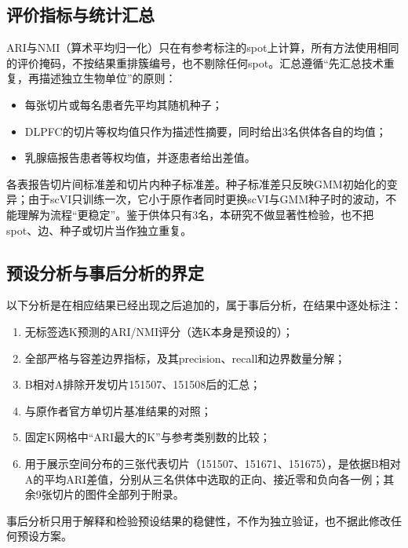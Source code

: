 \subsection{评价指标与统计汇总}
\label{subsec:cc-metrics-p1}
ARI与NMI（算术平均归一化）只在有参考标注的spot上计算，所有方法使用相同的评价掩码，不按结果重排簇编号，也不剔除任何spot。汇总遵循“先汇总技术重复，再描述独立生物单位”的原则：
\begin{itemize}
  \item 每张切片或每名患者先平均其随机种子；
  \item DLPFC的切片等权均值只作为描述性摘要，同时给出3名供体各自的均值；
  \item 乳腺癌报告患者等权均值，并逐患者给出差值。
\end{itemize}
各表报告切片间标准差和切片内种子标准差。种子标准差只反映GMM初始化的变异；由于scVI只训练一次，它小于原作者同时更换scVI与GMM种子时的波动，不能理解为流程“更稳定”。鉴于供体只有3名，本研究不做显著性检验，也不把spot、边、种子或切片当作独立重复。

\subsection{预设分析与事后分析的界定}
\label{subsec:cc-posthoc-p1}
以下分析是在相应结果已经出现之后追加的，属于事后分析，在结果中逐处标注：
\begin{enumerate}
  \item 无标签选K预测的ARI/NMI评分（选K本身是预设的）；
  \item 全部严格与容差边界指标，及其precision、recall和边界数量分解；
  \item B相对A排除开发切片151507、151508后的汇总；
  \item 与原作者官方单切片基准结果的对照；
  \item 固定K网格中“ARI最大的K”与参考类别数的比较；
  \item 用于展示空间分布的三张代表切片（151507、151671、151675），是依据B相对A的平均ARI差值，分别从三名供体中选取的正向、接近零和负向各一例；其余9张切片的图件全部列于附录。
\end{enumerate}
事后分析只用于解释和检验预设结果的稳健性，不作为独立验证，也不据此修改任何预设方案。
